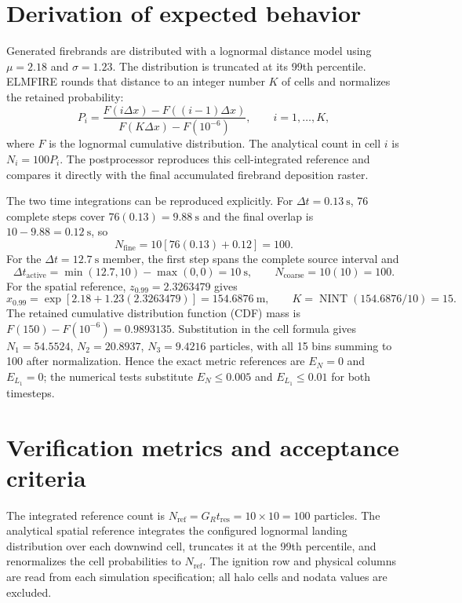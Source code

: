 \section{Derivation of expected behavior}
Generated firebrands are distributed with a lognormal distance model using
$\mu=2.18$ and $\sigma=1.23$. The distribution is truncated at its 99th
percentile. ELMFIRE rounds that distance to an integer number $K$ of cells and
normalizes the retained probability:
\[
  P_i=\frac{F(i\Delta x)-F((i-1)\Delta x)}
             {F(K\Delta x)-F(10^{-6})},\qquad i=1,\ldots,K,
\]
where $F$ is the lognormal cumulative distribution. The analytical count in
cell $i$ is $N_i=100P_i$. The postprocessor reproduces this cell-integrated
reference and compares it directly with the final accumulated firebrand deposition raster.

The two time integrations can be reproduced explicitly.  For
\(\Delta t=0.13~\mathrm{s}\), 76 complete steps cover
\(76(0.13)=9.88~\mathrm{s}\) and the final overlap is
\(10-9.88=0.12~\mathrm{s}\), so
\[
 N_{\mathrm{fine}}=10[76(0.13)+0.12]=100.
\]
For the \(\Delta t=12.7~\mathrm{s}\) member, the first step spans the complete
source interval and
\[
 \Delta t_{\mathrm{active}}=\min(12.7,10)-\max(0,0)=10~\mathrm{s},
 \qquad N_{\mathrm{coarse}}=10(10)=100.
\]
For the spatial reference, \(z_{0.99}=2.3263479\) gives
\[
 x_{0.99}=\exp[2.18+1.23(2.3263479)]=154.6876~\mathrm{m},
 \qquad K=\operatorname{NINT}(154.6876/10)=15.
\]
The retained cumulative distribution function (CDF) mass is
\(F(150)-F(10^{-6})=0.9893135\).  Substitution in the cell formula gives
\(N_1=54.5524\), \(N_2=20.8937\), \(N_3=9.4216\) particles, with all 15
bins summing to 100 after normalization.  Hence the exact metric references
are \(E_N=0\) and \(E_{L_1}=0\); the numerical tests substitute
\(E_N\leq0.005\) and \(E_{L_1}\leq0.01\) for both timesteps.

\section{Verification metrics and acceptance criteria}

The integrated reference count is
\(N_{\mathrm{ref}}=G_Rt_{\mathrm{res}}=10\times10=100\) particles. The analytical
spatial reference integrates the configured lognormal landing distribution over
each downwind cell, truncates it at the 99th percentile, and renormalizes the
cell probabilities to \(N_{\mathrm{ref}}\). The ignition row and physical columns
are read from each simulation specification; all halo cells and nodata values are excluded.

